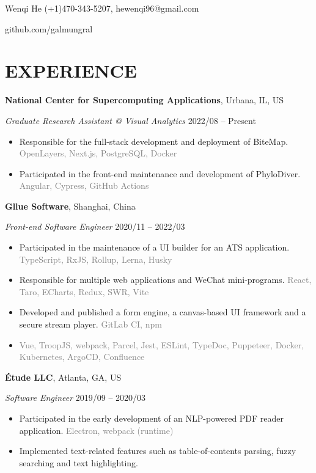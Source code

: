 \documentclass[10pt]{article}
\begin{document}
{\huge Wenqi He} \hfill (+1)470-343-5207, hewenqi96@gmail.com

\hfill github.com/galmungral

\section*{EXPERIENCE}
\textbf{National Center for Supercomputing Applications}, Urbana, IL, US

\textit{Graduate Research Assistant @ Visual Analytics} \hfill 2022/08 -- Present

\begin{itemize}[itemsep=0pt, topsep=4pt, label=-]
\item Responsible for the full-stack development and deployment of BiteMap. \hfill \textcolor{gray}{OpenLayers, Next.js, PostgreSQL, Docker}
\item Participated in the front-end maintenance and development of PhyloDiver. \hfill \textcolor{gray}{Angular, Cypress, GitHub Actions}
\end{itemize}

\vspace{0.5em}
\textbf{Gllue Software}, Shanghai, China

\textit{Front-end Software Engineer}  \hfill 2020/11 -- 2022/03

\begin{itemize}[itemsep=0pt, topsep=4pt, label=-]
\item Participated in the maintenance of a UI builder for an ATS application. \hfill \textcolor{gray}{TypeScript, RxJS, Rollup, Lerna, Husky}
\item Responsible for multiple web applications and WeChat mini-programs. \hfill \textcolor{gray}{React, Taro, ECharts, Redux, SWR, Vite}
\item Developed and published a form engine, a canvas-based UI framework and a secure stream player. \hfill \textcolor{gray}{GitLab CI, npm}
\item \hfill \textcolor{gray}{Vue, TroopJS, webpack, Parcel, Jest, ESLint, TypeDoc, Puppeteer, Docker, Kubernetes, ArgoCD, Confluence}
\end{itemize}
\vspace{0.5em}
\textbf{Étude LLC}, Atlanta, GA, US

\textit{Software Engineer} \hfill 2019/09 -- 2020/03

\begin{itemize}[itemsep=0pt, topsep=4pt, label=-]
\item Participated in the early development of an NLP-powered PDF reader application. \hfill \textcolor{gray}{Electron, webpack (runtime)}
\item Implemented text-related features such as table-of-contents parsing, fuzzy searching and text highlighting.
\end{itemize}
\end{document}
